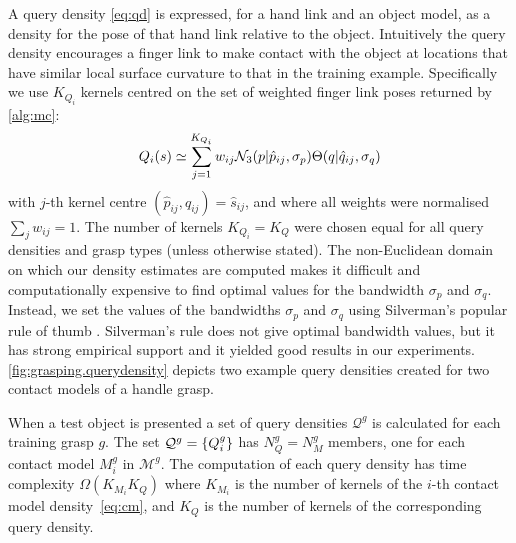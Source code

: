A query density \eqref{eq:qd} is expressed, for a hand link and an object model, as a density for the pose of that hand link relative to the object. Intuitively the query density encourages a finger link to make contact with the object at locations that have similar local surface curvature to that in the training example. Specifically we use $K_{Q_i}$ kernels centred on the set of weighted finger link poses returned by \alg\ref{alg:mc}:
\begin{equation}
\qd_i(s) \simeq \sum^{K_{Q_i}}_{j=1} w_{ij} \mathcal{N}_3(p|{\hat{p}_{ij}}, \sigma_{p}) \Theta(q|{\hat{q}_{ij}}, \sigma_{q})%
\label{eq:qd.approx}
\end{equation}
with $j$-th kernel centre $({\hat{p}_{ij}}, {\hat{q}_{ij}}) = \hat{s}_{ij}$, and where all weights were normalised $\sum_j w_{ij} = 1$. The number of kernels $K_{Q_i} = K_Q$ were chosen equal for all query densities and grasp types (unless otherwise stated). The non-Euclidean domain on which our density estimates are computed makes it difficult and computationally expensive to find optimal values for the bandwidth $\sigma_{p}$ and $\sigma_{q}$. Instead, we set the values of the bandwidths $\sigma_{p}$ and $\sigma_{q}$ using Silverman's popular rule of thumb \cite{silverman}. Silverman's rule does not give optimal bandwidth values, but it has strong empirical support and it yielded good results in our experiments. \fig\ref{fig:grasping.querydensity} depicts two example query densities created for two contact models of a handle grasp.

When a test object is presented a set of query densities $\mathcal{Q}^g$ is calculated for each training grasp $g$. The set $\mathcal{Q}^g =\{Q_i^g\}$ has $N^g_Q=N^g_M$ members, one for each contact model $M_i^g$ in $\mathcal{M}^g$. The computation of each  query density has time complexity $\Omega( K_{M_i} K_Q)$ where $K_{M_i}$ is the number of kernels of the $i$-th contact model density~\eqref{eq:cm}, and $K_Q$ is the number of kernels of the corresponding query density. 